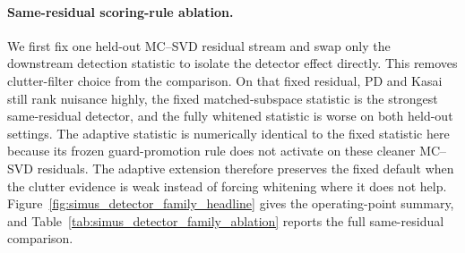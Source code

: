\documentclass[11pt]{article}
\begin{document}
\paragraph{Same-residual scoring-rule ablation.}
We first fix one held-out MC--SVD residual stream and swap only the downstream detection statistic to isolate the detector effect directly. This removes clutter-filter choice from the comparison. On that fixed residual, PD and Kasai still rank nuisance highly, the fixed matched-subspace statistic is the strongest same-residual detector, and the fully whitened statistic is worse on both held-out settings. The adaptive statistic is numerically identical to the fixed statistic here because its frozen guard-promotion rule does not activate on these cleaner MC--SVD residuals. The adaptive extension therefore preserves the fixed default when the clutter evidence is weak instead of forcing whitening where it does not help. Figure~\ref{fig:simus_detector_family_headline} gives the operating-point summary, and Table~\ref{tab:simus_detector_family_ablation} reports the full same-residual comparison.
\end{document}
